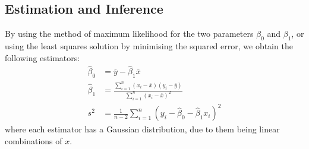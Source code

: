 \documentclass{article}
\begin{document}
\subsection{Estimation and Inference}
By using the method of maximum likelihood for the two parameters
\(\beta_0\) and \(\beta_1\), or using the least squares solution by
minimising the squared error, we obtain the following estimators:
\begin{align*}
    \hat{\beta}_0 & = \overline{y} - \hat{\beta}_1 \overline{x}                                                                                                     \\
    \hat{\beta}_1 & = \frac{\sum_{i = 1}^n \left( x_i - \overline{x} \right) \left( y_i - \overline{y} \right)}{\sum_{i = 1}^n \left( x_i - \overline{x} \right)^2} \\
    s^2           & = \frac{1}{n - 2} \sum_{i = 1}^n \left( y_i - \hat{\beta}_0 - \hat{\beta}_1 x_i \right)^2
\end{align*}
where each estimator has a Gaussian distribution, due to them being linear combinations of \(x\).
\end{document}

